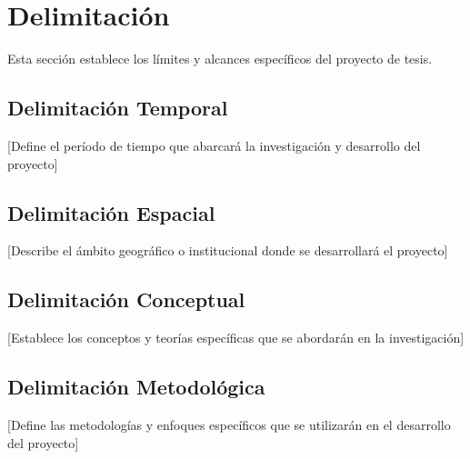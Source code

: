 \section{Delimitación}

Esta sección establece los límites y alcances específicos del proyecto de tesis.

\subsection{Delimitación Temporal}
[Define el período de tiempo que abarcará la investigación y desarrollo del proyecto]

\subsection{Delimitación Espacial}
[Describe el ámbito geográfico o institucional donde se desarrollará el proyecto]

\subsection{Delimitación Conceptual}
[Establece los conceptos y teorías específicas que se abordarán en la investigación]

\subsection{Delimitación Metodológica}
[Define las metodologías y enfoques específicos que se utilizarán en el desarrollo del proyecto]